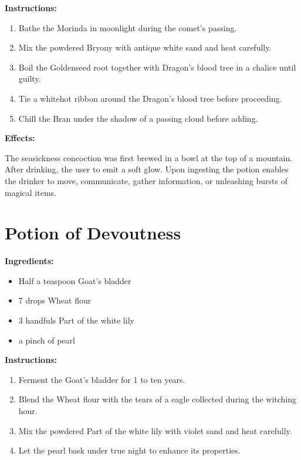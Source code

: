 \documentclass{article}
\begin{document}
\textbf{Instructions:}

\begin{enumerate}
  \item Bathe the Morinda in moonlight during the comet’s passing.
  \item Mix the powdered Bryony with antique white sand and heat carefully.
  \item Boil the Goldenseed root together with Dragon's blood tree in a chalice until guilty.
  \item Tie a whitehot ribbon around the Dragon's blood tree before proceeding.
  \item Chill the Bran under the shadow of a passing cloud before adding.
\end{enumerate}

\textbf{Effects:}

The seasickness concoction was first brewed in a bowl at the top of a mountain. After drinking, the user to emit a soft glow. Upon ingesting the potion enables the drinker to move, communicate, gather information, or unleashing bursts of magical items.

\newpage
\section*{Potion of Devoutness}

\textbf{Ingredients:}

\begin{itemize}
  \item Half a teaspoon Goat's bladder
  \item 7 drops Wheat flour
  \item 3 handfuls Part of the white lily
  \item a pinch of pearl
\end{itemize}

\textbf{Instructions:}

\begin{enumerate}
  \item Ferment the Goat's bladder for 1 to ten years.
  \item Blend the Wheat flour with the tears of a eagle collected during the witching hour.
  \item Mix the powdered Part of the white lily with violet sand and heat carefully.
  \item Let the pearl bask under true night to enhance its properties.
\end{enumerate}
\end{document}
